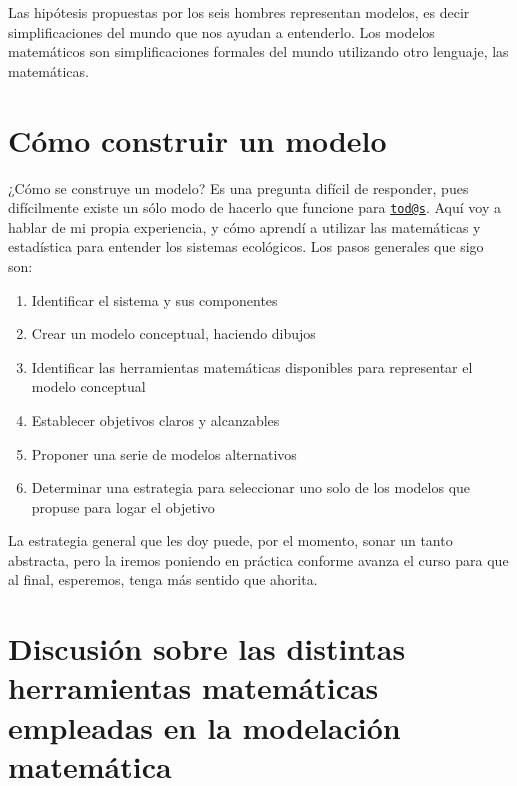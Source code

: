 \documentclass[
]{book}
\providecommand{\tightlist}{%
  \setlength{\itemsep}{0pt}\setlength{\parskip}{0pt}}
\begin{document}
Las hipótesis propuestas por los seis hombres representan modelos, es decir simplificaciones del mundo que nos ayudan a entenderlo. Los modelos matemáticos son simplificaciones formales del mundo utilizando otro lenguaje, las matemáticas.

\hypertarget{cuxf3mo-construir-un-modelo}{%
\section{Cómo construir un modelo}\label{cuxf3mo-construir-un-modelo}}

¿Cómo se construye un modelo? Es una pregunta difícil de responder, pues difícilmente existe un sólo modo de hacerlo que funcione para \href{mailto:tod@s}{\nolinkurl{tod@s}}. Aquí voy a hablar de mi propia experiencia, y cómo aprendí a utilizar las matemáticas y estadística para entender los sistemas ecológicos. Los pasos generales que sigo son:

\begin{enumerate}
\def\labelenumi{\arabic{enumi}.}
\tightlist
\item
  Identificar el sistema y sus componentes
\item
  Crear un modelo conceptual, haciendo dibujos
\item
  Identificar las herramientas matemáticas disponibles para representar el modelo conceptual
\item
  Establecer objetivos claros y alcanzables
\item
  Proponer una serie de modelos alternativos
\item
  Determinar una estrategia para seleccionar uno solo de los modelos que propuse para logar el objetivo
\end{enumerate}

La estrategia general que les doy puede, por el momento, sonar un tanto abstracta, pero la iremos poniendo en práctica conforme avanza el curso para que al final, esperemos, tenga más sentido que ahorita.

\hypertarget{discusiuxf3n-sobre-las-distintas-herramientas-matemuxe1ticas-empleadas-en-la-modelaciuxf3n-matemuxe1tica}{%
\section{Discusión sobre las distintas herramientas matemáticas empleadas en la modelación matemática}\label{discusiuxf3n-sobre-las-distintas-herramientas-matemuxe1ticas-empleadas-en-la-modelaciuxf3n-matemuxe1tica}}
\end{document}
